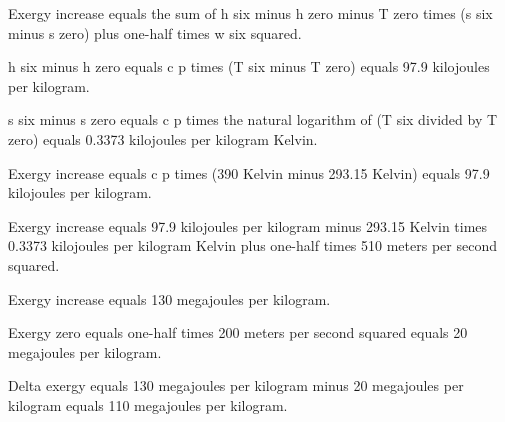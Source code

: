 Exergy increase equals the sum of h six minus h zero minus T zero times (s six minus s zero) plus one-half times w six squared.  

h six minus h zero equals c p times (T six minus T zero) equals 97.9 kilojoules per kilogram.  

s six minus s zero equals c p times the natural logarithm of (T six divided by T zero) equals 0.3373 kilojoules per kilogram Kelvin.  

Exergy increase equals c p times (390 Kelvin minus 293.15 Kelvin) equals 97.9 kilojoules per kilogram.  

Exergy increase equals 97.9 kilojoules per kilogram minus 293.15 Kelvin times 0.3373 kilojoules per kilogram Kelvin plus one-half times 510 meters per second squared.  

Exergy increase equals 130 megajoules per kilogram.  

Exergy zero equals one-half times 200 meters per second squared equals 20 megajoules per kilogram.  

Delta exergy equals 130 megajoules per kilogram minus 20 megajoules per kilogram equals 110 megajoules per kilogram.